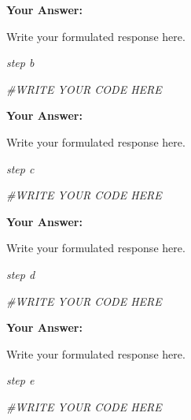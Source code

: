 \documentclass[
]{article}
\newenvironment{Shaded}{\begin{snugshade}}{\end{snugshade}}
\newcommand{\CommentTok}[1]{\textcolor[rgb]{0.56,0.35,0.01}{\textit{#1}}}
\begin{document}
\textbf{Your Answer:}

Write your formulated response here.

\emph{step b}

\begin{Shaded}
\begin{Highlighting}[]
\CommentTok{\#WRITE YOUR CODE HERE}
\end{Highlighting}
\end{Shaded}

\textbf{Your Answer:}

Write your formulated response here.

\emph{step c}

\begin{Shaded}
\begin{Highlighting}[]
\CommentTok{\#WRITE YOUR CODE HERE}
\end{Highlighting}
\end{Shaded}

\textbf{Your Answer:}

Write your formulated response here.

\emph{step d}

\begin{Shaded}
\begin{Highlighting}[]
\CommentTok{\#WRITE YOUR CODE HERE}
\end{Highlighting}
\end{Shaded}

\textbf{Your Answer:}

Write your formulated response here.

\emph{step e}

\begin{Shaded}
\begin{Highlighting}[]
\CommentTok{\#WRITE YOUR CODE HERE}
\end{Highlighting}
\end{Shaded}
\end{document}
